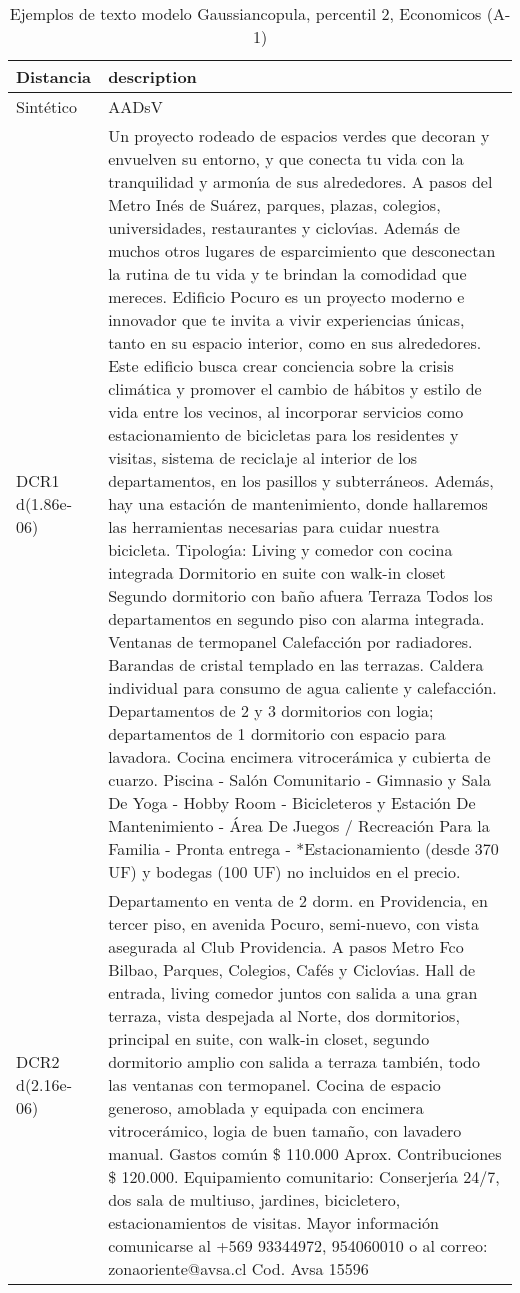\begin{table}[H]
\centering
\fontsize{10}{14}\selectfont
\caption{Ejemplos de texto modelo Gaussiancopula, percentil 2, Economicos (A-1)}
\label{table-example-economicos-a-1-gaussiancopula-2p-text}
\begin{tabular}{|l|m{35em}|}
\hline
\rowcolor[gray]{0.8}
Distancia & description \\
\hline Sintético & AADsV \\
\hline DCR1 d(1.86e-06) & Un proyecto rodeado de espacios verdes que decoran y envuelven su entorno, y que conecta tu vida con la tranquilidad y armon{\'\i}a de sus alrededores. A pasos del Metro In\'es de Su\'arez, parques, plazas, colegios, universidades, restaurantes y ciclov{\'\i}as. Adem\'as de muchos otros lugares de esparcimiento que desconectan la rutina de tu vida y te brindan la comodidad que mereces.  Edificio Pocuro es un proyecto moderno e innovador que te invita a vivir experiencias \'unicas, tanto en su espacio interior, como en sus alrededores. Este edificio busca crear conciencia sobre la crisis clim\'atica y promover el cambio de h\'abitos y estilo de vida entre los vecinos, al incorporar servicios como estacionamiento de bicicletas para los residentes y visitas, sistema de reciclaje al interior de los departamentos, en los pasillos y subterr\'aneos. Adem\'as, hay una estaci\'on de mantenimiento, donde hallaremos las herramientas necesarias para cuidar nuestra bicicleta.   Tipolog{\'\i}a: Living y comedor con cocina integrada  Dormitorio en suite con walk-in closet Segundo dormitorio con ba\~no afuera Terraza   Todos los departamentos en segundo piso con alarma integrada. Ventanas de termopanel Calefacci\'on por radiadores. Barandas de cristal templado en las terrazas. Caldera individual para consumo de agua caliente y calefacci\'on. Departamentos de 2 y 3 dormitorios con logia; departamentos de 1 dormitorio con espacio para lavadora. Cocina encimera vitrocer\'amica y cubierta de cuarzo.  Piscina - Sal\'on Comunitario - Gimnasio y Sala De Yoga - Hobby Room - Bicicleteros y Estaci\'on De Mantenimiento - \'Area De Juegos / Recreaci\'on Para la Familia   - Pronta entrega -  *Estacionamiento (desde 370 UF) y bodegas (100 UF) no incluidos en el precio. \\
\hline DCR2 d(2.16e-06) & Departamento en venta de 2 dorm. en Providencia, en tercer piso, en avenida Pocuro, semi-nuevo, con vista asegurada al Club Providencia. A pasos Metro Fco Bilbao, Parques, Colegios, Caf\'es y Ciclov{\'\i}as. Hall de entrada, living comedor juntos con salida a una gran terraza, vista despejada al Norte, dos dormitorios, principal en suite, con walk-in closet, segundo dormitorio amplio con salida a terraza tambi\'en, todo las ventanas con termopanel. Cocina de espacio generoso, amoblada y equipada con encimera vitrocer\'amico, logia de buen tama\~no, con lavadero manual. Gastos com\'un \$ 110.000 Aprox. Contribuciones \$ 120.000. Equipamiento comunitario: Conserjer{\'\i}a 24/7, dos sala de multiuso, jardines, bicicletero, estacionamientos de visitas. Mayor informaci\'on comunicarse al +569 93344972, 954060010 o al correo: zonaoriente@avsa.cl Cod. Avsa 15596 \\
\hline
\end{tabular}
\end{table}
